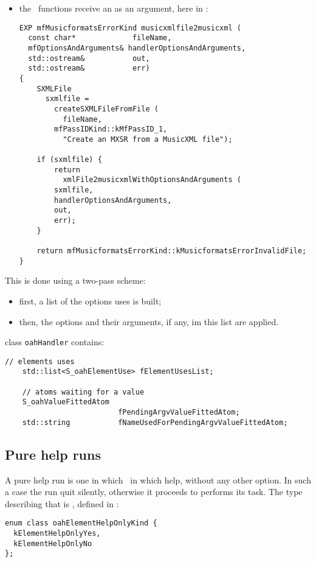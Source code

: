 {\begin{itemize}
\begin{lstlisting}[language=CPlusPlus]
  // ... ... ...
}
\end{lstlisting}

\item the \API\ functions receive an  as an argument, here in :
\begin{lstlisting}[language=CPlusPlus]
EXP mfMusicformatsErrorKind musicxmlfile2musicxml (
  const char*             fileName,
  mfOptionsAndArguments& handlerOptionsAndArguments,
  std::ostream&           out,
  std::ostream&           err)
{
	SXMLFile
	  sxmlfile =
	    createSXMLFileFromFile (
	      fileName,
	    mfPassIDKind::kMfPassID_1,
	      "Create an MXSR from a MusicXML file");

	if (sxmlfile) {
		return
		  xmlFile2musicxmlWithOptionsAndArguments (
        sxmlfile,
        handlerOptionsAndArguments,
        out,
        err);
	}

	return mfMusicformatsErrorKind::kMusicformatsErrorInvalidFile;
}
\end{lstlisting}

\end{itemize}

This is done using a two-pass scheme:
\begin{itemize}
\item first, a list of the options uses is built;
\item then, the options and their arguments, if any, im this list are applied.
\end{itemize}

class   {\tt oahHandler} contains:
\begin{lstlisting}[language=CPlusPlus]
    // elements uses
    std::list<S_oahElementUse> fElementUsesList;

    // atoms waiting for a value
    S_oahValueFittedAtom
                          fPendingArgvValueFittedAtom;
    std::string           fNameUsedForPendingArgvValueFittedAtom;
\end{lstlisting}


	\subsection{Pure help runs}

A pure help run is one in which \mf\ in which help, without any other option. In such a case the run quit silently, otherwise it proceeds to performs its task. The type describing that is , defined in :
\begin{lstlisting}[language=CPlusPlus]
enum class oahElementHelpOnlyKind {
  kElementHelpOnlyYes,
  kElementHelpOnlyNo
};
\end{lstlisting}


}
